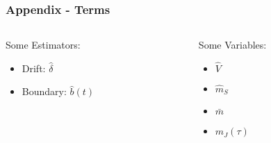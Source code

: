 \begin{frame}[noframenumbering]
    \label{Terms}
    \frametitle{Appendix - Terms}

    \begin{columns}[t] %
        \begin{column}{0.5\textwidth} %
            Some Estimators:
            \begin{itemize}
                \item Drift: $\hat{\delta}$
                \item Boundary: $\hat{b}(t)$
            \end{itemize}
        \end{column}
        \begin{column}{0.5\textwidth} %
            Some Variables:
            \begin{itemize}
                \item $\hat{V}$
                \item $\hat{m}_S$
                \item $\bar{m}$
                \item $m_J(\tau)$\newline\newline
            \end{itemize}
        \end{column}
    \end{columns}
    \hyperlink{Maths}{}
\end{frame}